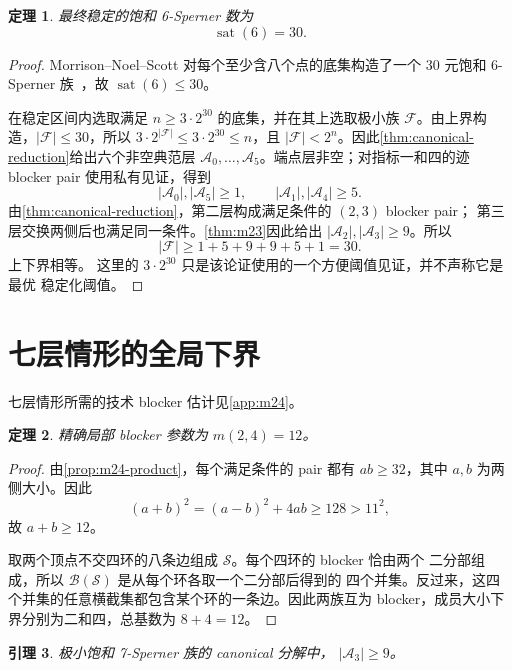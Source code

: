 \documentclass[UTF8,11pt,a4paper,fontset=fandol]{ctexart}
\newtheorem{theorem}{定理}[section]
\newtheorem{lemma}[theorem]{引理}
\theoremstyle{definition}
\theoremstyle{remark}
\newcommand{\family}{\mathcal{F}}
\newcommand{\sat}{\operatorname{sat}}
\newcommand{\blocker}{\mathcal{B}}
\begin{document}
\begin{theorem}
\label{thm:sat6}
最终稳定的饱和 6-Sperner 数为
\[
  \sat(6)=30.
\]
\end{theorem}

\begin{proof}
Morrison--Noel--Scott 对每个至少含八个点的底集构造了一个 30 元饱和
6-Sperner 族~\cite[Proposition~20]{mns2014}，故 $\sat(6)\leq30$。

在稳定区间内选取满足 $n\geq3\cdot2^{30}$ 的底集，并在其上选取极小族
$\family$。由上界构造，$|\family|\leq30$，所以
$3\cdot2^{|\family|}\leq3\cdot2^{30}\leq n$，且
$|\family|<2^n$。因此\cref{thm:canonical-reduction}给出六个非空典范层
$\mathcal A_0,\ldots,\mathcal A_5$。端点层非空；对指标一和四的迹 blocker
pair 使用私有见证，得到
\[
  |\mathcal A_0|,|\mathcal A_5|\geq1,\qquad
  |\mathcal A_1|,|\mathcal A_4|\geq5.
\]
由\cref{thm:canonical-reduction}，第二层构成满足条件的 $(2,3)$ blocker pair；
第三层交换两侧后也满足同一条件。\cref{thm:m23}因此给出
$|\mathcal A_2|,|\mathcal A_3|\geq9$。所以
\[
  |\family|\geq1+5+9+9+5+1=30.
\]
上下界相等。
这里的 $3\cdot2^{30}$ 只是该论证使用的一个方便阈值见证，并不声称它是最优
稳定化阈值。
\end{proof}

\section{七层情形的全局下界}
\label{sec:sat7-lower}

七层情形所需的技术 blocker 估计见\cref{app:m24}。

\begin{theorem}
\label{thm:m24}
精确局部 blocker 参数为 $m(2,4)=12$。
\end{theorem}

\begin{proof}
由\cref{prop:m24-product}，每个满足条件的 pair 都有 $ab\geq32$，其中
$a,b$ 为两侧大小。因此
\[
  (a+b)^2=(a-b)^2+4ab\geq128>11^2,
\]
故 $a+b\geq12$。

取两个顶点不交四环的八条边组成 $\mathcal S$。每个四环的 blocker 恰由两个
二分部组成，所以 $\blocker(\mathcal S)$ 是从每个环各取一个二分部后得到的
四个并集。反过来，这四个并集的任意横截集都包含某个环的一条边。因此两族互为
blocker，成员大小下界分别为二和四，总基数为 $8+4=12$。
\end{proof}

\begin{lemma}
\label{lem:middle-nine}
极小饱和 7-Sperner 族的 canonical 分解中，
$|\mathcal A_3|\geq9$。
\end{lemma}
\end{document}
